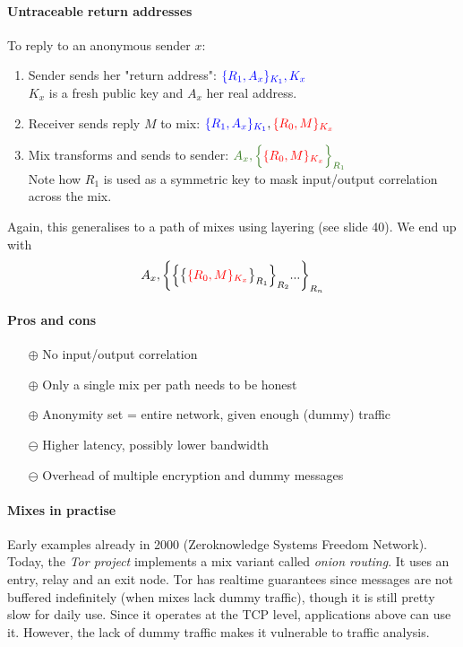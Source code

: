 \paragraph{Untraceable return addresses} To reply to an anonymous sender $x$:
\begin{enumerate}
    \item Sender sends her "return address": $\textcolor{blue}{ \{ R_1, A_x \}_{K_1}, K_x }$ \\
    $K_x$ is a fresh public key and $A_x$ her real address.
    \item Receiver sends reply $M$ to mix: $\textcolor{blue}{ \{ R_1, A_x \}_{K_1}}, \textcolor{red}{\{ R_0, M \}_{K_x} }$
    \item Mix transforms and sends to sender: $\textcolor{OliveGreen}{ A_x , \Big\{ } \textcolor{red}{\{ R_0, M \}_{K_x} } \textcolor{OliveGreen}{ \Big\} _{R_1} }$ \\
    Note how $R_1$ is used as a symmetric key to mask input/output correlation across the mix.
\end{enumerate}
Again, this generalises to a path of mixes using layering (see slide 40). We end up with
$$
A_x, \bigg\{ \Big\{ \big\{
\textcolor{red}{\{ R_0, M \}_{K_x} }
\big\}_{R_1} \Big\}_{R_2} ... \bigg\} _{R_n}
$$


\paragraph{Pros and cons}
\begin{itemize}
    \item[$\oplus$] No input/output correlation
    \item[$\oplus$] Only a single mix per path needs to be honest
    \item[$\oplus$] Anonymity set = entire network, given enough (dummy) traffic
    \item[$\ominus$] Higher latency, possibly lower bandwidth
    \item[$\ominus$] Overhead of multiple encryption and dummy messages
\end{itemize}

\paragraph{Mixes in practise} Early examples already in 2000 (Zeroknowledge Systems Freedom Network). Today, the \emph{Tor project} implements a mix variant called \emph{onion routing}. It uses an entry, relay and an exit node. Tor has realtime guarantees since messages are not buffered indefinitely (when mixes lack dummy traffic), though it is still pretty slow for daily use. Since it operates at the TCP level, applications above can use it. However, the lack of dummy traffic makes it vulnerable to traffic analysis.


